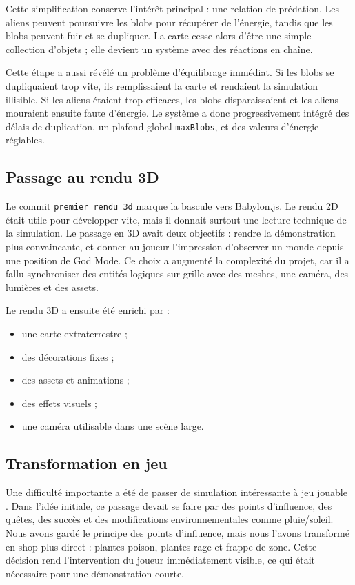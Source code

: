 ﻿\documentclass[11pt,a4paper]{article}
\begin{document}
Cette simplification conserve l'intérêt principal : une relation de prédation. Les aliens peuvent poursuivre les blobs pour récupérer de l'énergie, tandis que les blobs peuvent fuir et se dupliquer. La carte cesse alors d'être une simple collection d'objets ; elle devient un système avec des réactions en chaîne.

Cette étape a aussi révélé un problème d'équilibrage immédiat. Si les blobs se dupliquaient trop vite, ils remplissaient la carte et rendaient la simulation illisible. Si les aliens étaient trop efficaces, les blobs disparaissaient et les aliens mouraient ensuite faute d'énergie. Le système a donc progressivement intégré des délais de duplication, un plafond global \texttt{maxBlobs}, et des valeurs d'énergie réglables.

\subsection{Passage au rendu 3D}

Le commit \texttt{premier rendu 3d} marque la bascule vers Babylon.js. Le rendu 2D était utile pour développer vite, mais il donnait surtout une lecture technique de la simulation. Le passage en 3D avait deux objectifs : rendre la démonstration plus convaincante, et donner au joueur l'impression d'observer un monde depuis une position de God Mode. Ce choix a augmenté la complexité du projet, car il a fallu synchroniser des entités logiques sur grille avec des meshes, une caméra, des lumières et des assets.

Le rendu 3D a ensuite été enrichi par :

\begin{itemize}[noitemsep]
  \item une carte extraterrestre ;
  \item des décorations fixes ;
  \item des assets et animations ;
  \item des effets visuels ;
  \item une caméra utilisable dans une scène large.
\end{itemize}

\subsection{Transformation en jeu}

Une difficulté importante a été de passer de \og simulation intéressante \fg{} à \og jeu jouable \fg{}. Dans l'idée initiale, ce passage devait se faire par des points d'influence, des quêtes, des succès et des modifications environnementales comme pluie/soleil. Nous avons gardé le principe des points d'influence, mais nous l'avons transformé en shop plus direct : plantes poison, plantes rage et frappe de zone. Cette décision rend l'intervention du joueur immédiatement visible, ce qui était nécessaire pour une démonstration courte.
\end{document}
